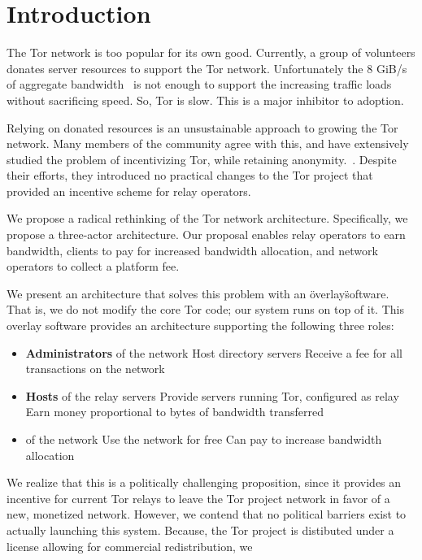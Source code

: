 \section{Introduction}

The Tor network is too popular for its own good. Currently, a group of volunteers donates server resources to support the Tor network. Unfortunately the 8 GiB/s of aggregate bandwidth~\cite{tornetmet} is not enough to support the increasing traffic loads without sacrificing speed. So, Tor is slow. This is a major inhibitor to adoption. 

Relying on donated resources is an unsustainable approach to growing the Tor network. Many members of the community agree with this, and have extensively studied the problem of incentivizing Tor, while retaining anonymity.~\cite{raykova-pet2008, wpes09-xpay, incentives-fc10,
ccs10-braids, acsac11-tortoise, jansen2013lira, johnson2013onions}. Despite their efforts, they introduced no practical changes to the Tor project that provided an incentive scheme for relay operators.

We propose a radical rethinking of the Tor network architecture. Specifically, we propose a three-actor architecture. Our proposal enables relay operators to earn bandwidth, clients to pay for increased bandwidth allocation, and network operators to collect a platform fee.

We present an architecture that solves this problem with an \"overlay\" software. That is, we do not modify the core Tor code; our system runs on top of it. This overlay software provides an architecture supporting the following three roles:

\begin{itemize}
\item \textbf{Administrators} of the network
\subitem Host directory servers
\subitem Receive a fee for all transactions on the network
\item \textbf{Hosts} of the relay servers
\subitem Provide servers running Tor, configured as relay
\subitem Earn money proportional to bytes of bandwidth transferred
\item {} of the network
\subitem Use the network for free
\subitem Can pay to increase bandwidth allocation
\end{itemize}

We realize that this is a politically challenging proposition, since it provides an incentive for current Tor relays to leave the Tor project network in favor of a new, monetized network. However, we contend that no political barriers exist to actually launching this system. Because, the Tor project is distibuted under a license allowing for commercial redistribution, we 



